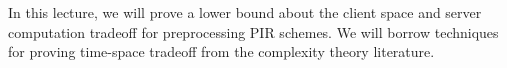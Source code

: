 
\newcommand{\bits}{\{0,1\}}
\newcommand{\bfu}{\mathbf{u}}
\newcommand{\bfv}{\mathbf{v}}
\newcommand{\bfp}{\mathbf{p}}
\newcommand{\bfz}{\mathbf{z}}
\newcommand{\bfx}{\mathbf{x}}
\newcommand{\bfy}{\mathbf{y}}

\newcommand{\calR}{\mathcal{R}}

\newcommand{\CNextMsg}{\ensuremath{{\sf C Next Msg}}}
\newcommand{\SNextMsg}{\ensuremath{{\sf S Next Msg}}}
\newcommand{\CNext}{\ensuremath{{\sf C Next}}}
\newcommand{\SNext}{\ensuremath{{\sf S Next}}}
\newcommand{\Cstp}{\ensuremath{{\sf Cst'}}}
\newcommand{\Cst}{\ensuremath{{\sf Cst}}}
\newcommand{\msg}{\ensuremath{{\sf msg}}}
\newcommand{\msgp}{\ensuremath{{\sf msg'}}}
\newcommand{\Coutput}{\ensuremath{{\sf Reconstr}}}
\newcommand{\ans}{\ensuremath{{\sf ans}}}
\newcommand{\Ccoins}{\ensuremath{{\sf Ccoins}}}
\newcommand{\Scoins}{\ensuremath{{\sf Scoins}}}
\newcommand{\Expt}{\ensuremath{{\sf Expt}}}
\newcommand{\coin}{\ensuremath{{\sf coin}}}
\newcommand{\View}{\ensuremath{{\sf View}}}
\newcommand{\PPT}{PPT }
\newcommand{\Out}{\ensuremath{{\sf Out}}}
\newcommand{\OWF}{\ensuremath{{\sf OWF}}}
\newcommand{\OT}{\ensuremath{{\sf OT}}}
\newcommand{\PIR}{\ensuremath{{\sf PIR}}}
\newcommand{\Server}{\ensuremath{{\sf Server}}}
\newcommand{\Client}{\ensuremath{{\sf Client}}}
\newcommand{\Alice}{\ensuremath{{\sf Alice}}}
\newcommand{\Bob}{\ensuremath{{\sf Bob}}}
\newcommand{\get}{\ensuremath{\leftarrow}}
\newcommand{\E}{\ensuremath{{\bf E}}}
\newcommand{\out}{\ensuremath{{\sf out}}}
\newcommand{\prob}{\ensuremath{\mathbb{P}}}
\newcommand{\known}{\ensuremath{{\sf known}}}
\newcommand{\enc}{\ensuremath{{\sf enc}}}
\newcommand{\db}{\ensuremath{{\sf DB}}}
\newcommand{\bbad}{\ensuremath{{\sf b_{bad}}}}
\newcommand{\bgood}{\ensuremath{{\sf b_{good}}}}


In this lecture, we will prove a lower bound about the client space and server computation 
tradeoff for preprocessing PIR schemes. 
We will borrow techniques for proving time-space tradeoff
from the complexity theory literature.

